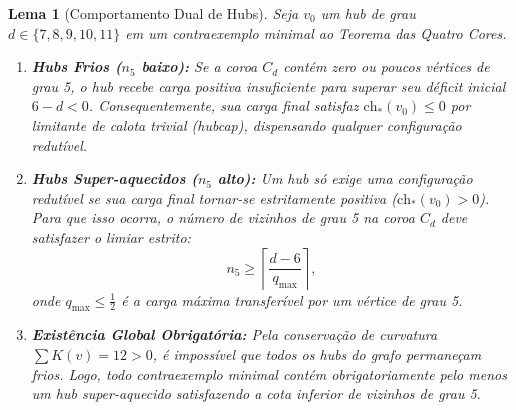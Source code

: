 \documentclass[11pt,a4paper]{article}
\theoremstyle{plain}
\newtheorem{lemma}[theorem]{Lema}
\theoremstyle{definition}
\begin{document}
\begin{lemma}[Comportamento Dual de Hubs]
Seja $v_0$ um hub de grau $d \in \{7, 8, 9, 10, 11\}$ em um contraexemplo minimal ao Teorema das Quatro Cores.
\begin{enumerate}
    \item \textbf{Hubs Frios ($n_5$ baixo):} Se a coroa $C_d$ contém zero ou poucos vértices de grau 5, o hub recebe carga positiva insuficiente para superar seu déficit inicial $6 - d < 0$. Consequentemente, sua carga final satisfaz $\text{ch}_*(v_0) \le 0$ por limitante de calota trivial (\emph{hubcap}), dispensando qualquer configuração redutível.
    \item \textbf{Hubs Super-aquecidos ($n_5$ alto):} Um hub só exige uma configuração redutível se sua carga final tornar-se estritamente positiva ($\text{ch}_*(v_0) > 0$). Para que isso ocorra, o número de vizinhos de grau 5 na coroa $C_d$ deve satisfazer o limiar estrito:
    \begin{equation}
    n_5 \ge \left\lceil \frac{d - 6}{q_{\max}} \right\rceil,
    \end{equation}
    onde $q_{\max} \le \frac{1}{2}$ é a carga máxima transferível por um vértice de grau 5.
    \item \textbf{Existência Global Obrigatória:} Pela conservação de curvatura $\sum K(v) = 12 > 0$, é impossível que todos os hubs do grafo permaneçam frios. Logo, todo contraexemplo minimal contém obrigatoriamente pelo menos um hub super-aquecido satisfazendo a cota inferior de vizinhos de grau 5.
\end{enumerate}
\end{lemma}
\end{document}
